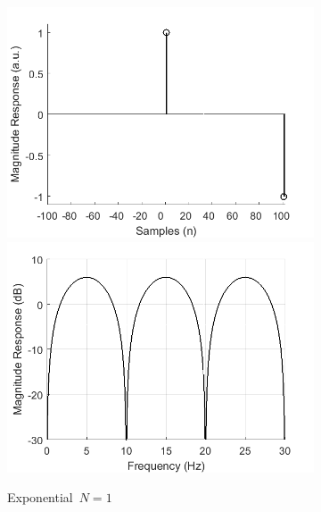 \documentclass[a4paper]{article}
\begin{document}
\begin{figure}[hbtp]
    \begin{subfigure}{.33\textwidth}
        \includegraphics[width=\textwidth]{img/np/kernel_exp_1.png}\\
        \includegraphics[width=\textwidth]{img/np/mag_exp_1.png}
        \caption{Exponential~$N=1$}\label{fig:ExNP1}
    \end{subfigure}
    \begin{subfigure}{.33\textwidth}

\end{subfigure}
\end{figure}
\end{document}
